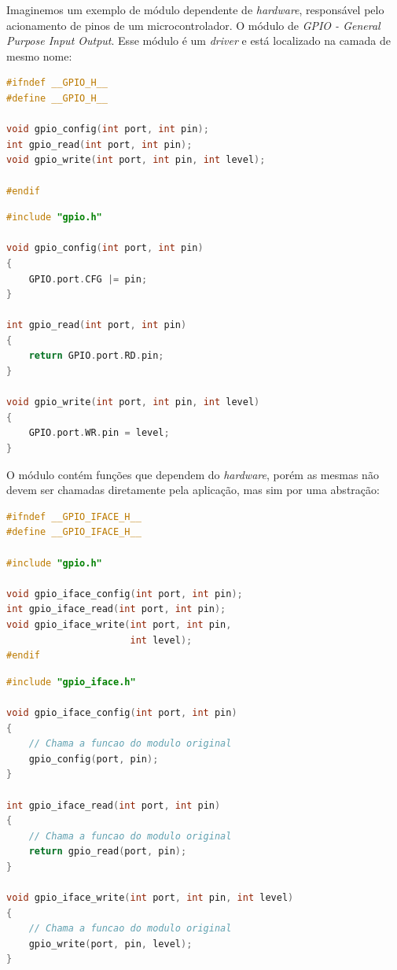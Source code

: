 \documentclass[times, twoside, watermark]{artigo}
\begin{document}
Imaginemos um exemplo de módulo dependente de \textit{hardware},
responsável pelo acionamento de pinos de um microcontrolador. O módulo de 
\textit{GPIO - General Purpose Input Output}. Esse módulo é um \textit{driver} e está 
localizado na camada de mesmo nome:

\begin{lstlisting}[language=C, caption=Interface do módulo de GPIO - gpio.h]
#ifndef __GPIO_H__
#define __GPIO_H__

void gpio_config(int port, int pin);
int gpio_read(int port, int pin);
void gpio_write(int port, int pin, int level);

#endif
\end{lstlisting}


\begin{lstlisting}[language=C, caption=Implementação do módulo de GPIO - gpio.c]
#include "gpio.h"

void gpio_config(int port, int pin)
{
    GPIO.port.CFG |= pin;
}

int gpio_read(int port, int pin)
{
    return GPIO.port.RD.pin;
}

void gpio_write(int port, int pin, int level)
{
    GPIO.port.WR.pin = level;
}
\end{lstlisting}

O módulo contém funções que dependem do \textit{hardware}, porém as mesmas não 
devem ser chamadas diretamente pela aplicação, mas sim por uma abstração:

\begin{lstlisting}[language=C, caption=Interface pública do módulo - gpio\_iface.h]
#ifndef __GPIO_IFACE_H__
#define __GPIO_IFACE_H__

#include "gpio.h"

void gpio_iface_config(int port, int pin);
int gpio_iface_read(int port, int pin);
void gpio_iface_write(int port, int pin,
                      int level);
#endif
\end{lstlisting}


\begin{lstlisting}[language=C, caption=Implementação da abstração para acesso ao 
módulo de GPIO - gpio\_iface.c]
#include "gpio_iface.h"

void gpio_iface_config(int port, int pin)
{
    // Chama a funcao do modulo original
    gpio_config(port, pin);
}

int gpio_iface_read(int port, int pin)
{
    // Chama a funcao do modulo original
    return gpio_read(port, pin);
}

void gpio_iface_write(int port, int pin, int level)
{
    // Chama a funcao do modulo original
    gpio_write(port, pin, level);
}
\end{lstlisting}
\end{document}
